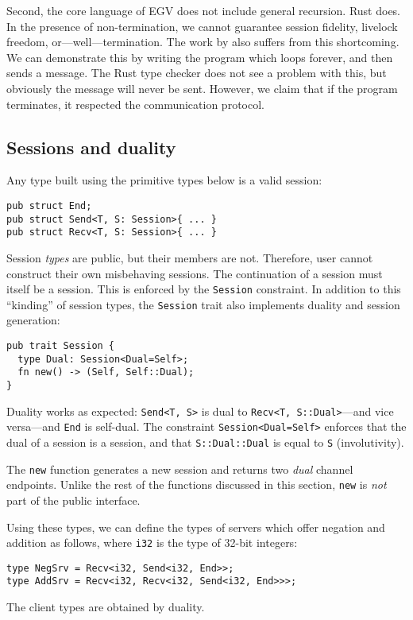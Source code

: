 \documentclass[sigconf,UKEnglish,natbib=false]{acmart}
\begin{document}
Second, the core language of EGV does not include general recursion. Rust does. In the presence of non-termination, we cannot guarantee session fidelity, livelock freedom, or---well---termination. The work by \textcite{jespersen2015} also suffers from this shortcoming. We can demonstrate this by writing the program which loops forever, and then sends a message. The Rust type checker does not see a problem with this, but obviously the message will never be sent. However, we claim that if the program terminates, it respected the communication protocol.

\subsection*{Sessions and duality}
Any type built using the primitive types below is a valid session:
\begin{lstlisting}
pub struct End;
pub struct Send<T, S: Session>{ ... }
pub struct Recv<T, S: Session>{ ... }
\end{lstlisting}
Session \emph{types} are public, but their members are not. Therefore, user cannot construct their own misbehaving sessions. The continuation of a session must itself be a session. This is enforced by the \lstinline{Session} constraint. In addition to this ``kinding'' of session types, the \lstinline{Session} trait also implements duality and session generation:
\begin{lstlisting}
pub trait Session {
  type Dual: Session<Dual=Self>;
  fn new() -> (Self, Self::Dual);
}
\end{lstlisting}
Duality works as expected: \lstinline{Send<T, S>} is dual to \lstinline{Recv<T, S::Dual>}---and vice versa---and \lstinline{End} is self-dual.
The constraint \lstinline{Session<Dual=Self>} enforces that the dual of a
session is a session, and that \lstinline{S::Dual::Dual} is equal to \lstinline{S} (involutivity).

The \lstinline{new} function generates a new session and returns two \emph{dual} channel endpoints. Unlike the rest of the functions discussed in this section, \lstinline{new} is \emph{not} part of the public interface.

Using these types, we can define the types of servers which offer negation and addition as follows, where \lstinline{i32} is the type of 32-bit integers:
\begin{lstlisting}
type NegSrv = Recv<i32, Send<i32, End>>;
type AddSrv = Recv<i32, Recv<i32, Send<i32, End>>>;
\end{lstlisting}
The client types are obtained by duality.
\end{document}
